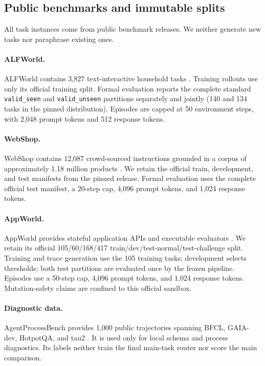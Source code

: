 \documentclass[10pt]{article}
\begin{document}
\subsection{Public benchmarks and immutable splits}
\label{sec:benchmarks}

All task instances come from public benchmark releases. We neither generate
new tasks nor paraphrase existing ones.

\paragraph{ALFWorld.}
ALFWorld contains 3,827 text-interactive household tasks
\citep{shridhar2021alfworld}. Training rollouts use only its official training
split. Formal evaluation reports the complete standard \texttt{valid\_seen}
and \texttt{valid\_unseen} partitions separately and jointly (140 and 134
tasks in the pinned distribution). Episodes are capped at 50 environment
steps, with 2,048 prompt tokens and 512 response tokens.

\paragraph{WebShop.}
WebShop contains 12,087 crowd-sourced instructions grounded in a corpus of
approximately 1.18 million products \citep{yao2022webshop}. We retain the
official train, development, and test manifests from the pinned release.
Formal evaluation uses the complete official test manifest, a 20-step cap,
4,096 prompt tokens, and 1,024 response tokens.

\paragraph{AppWorld.}
AppWorld provides stateful application APIs and executable evaluators
\citep{trivedi2024appworld}. We retain its official 105/60/168/417
train/dev/test-normal/test-challenge split. Training and trace generation use
the 105 training tasks; development selects thresholds; both test partitions
are evaluated once by the frozen pipeline. Episodes use a 50-step cap, 4,096
prompt tokens, and 1,024 response tokens. Mutation-safety claims are confined
to this official sandbox.

\paragraph{Diagnostic data.}
AgentProcessBench provides 1,000 public trajectories spanning BFCL, GAIA-dev,
HotpotQA, and tau2 \citep{fan2026agentprocessbench}. It is used only for local
schema and process diagnostics. Its labels neither train the final main-task
router nor score the main comparison.
\end{document}
